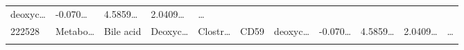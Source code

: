 \documentclass[
]{article}
\begin{document}
\begin{longtable}[]{@{}lllllllllll@{}}
\begin{minipage}[t]{0.09\columnwidth}
deoxyc\ldots{}\strut
\end{minipage} & \begin{minipage}[t]{0.07\columnwidth}\raggedright
-0.070\ldots{}\strut
\end{minipage} & \begin{minipage}[t]{0.07\columnwidth}\raggedright
4.5859\ldots{}\strut
\end{minipage} & \begin{minipage}[t]{0.07\columnwidth}\raggedright
2.0409\ldots{}\strut
\end{minipage} & \begin{minipage}[t]{0.03\columnwidth}\raggedright
\ldots{}\strut
\end{minipage}\tabularnewline
\begin{minipage}[t]{0.05\columnwidth}\raggedright
222528\strut
\end{minipage} & \begin{minipage}[t]{0.07\columnwidth}\raggedright
Metabo\ldots{}\strut
\end{minipage} & \begin{minipage}[t]{0.07\columnwidth}\raggedright
Bile acid\strut
\end{minipage} & \begin{minipage}[t]{0.09\columnwidth}\raggedright
Deoxyc\ldots{}\strut
\end{minipage} & \begin{minipage}[t]{0.07\columnwidth}\raggedright
Clostr\ldots{}\strut
\end{minipage} & \begin{minipage}[t]{0.07\columnwidth}\raggedright
CD59\strut
\end{minipage} & \begin{minipage}[t]{0.09\columnwidth}\raggedright
deoxyc\ldots{}\strut
\end{minipage} & \begin{minipage}[t]{0.07\columnwidth}\raggedright
-0.070\ldots{}\strut
\end{minipage} & \begin{minipage}[t]{0.07\columnwidth}\raggedright
4.5859\ldots{}\strut
\end{minipage} & \begin{minipage}[t]{0.07\columnwidth}\raggedright
2.0409\ldots{}\strut
\end{minipage} & \begin{minipage}[t]{0.03\columnwidth}\raggedright
\ldots{}\strut
\end{minipage}\tabularnewline
\begin{minipage}[t]{0.05\columnwidth}\raggedright

\end{minipage}
\end{longtable}
\end{document}
